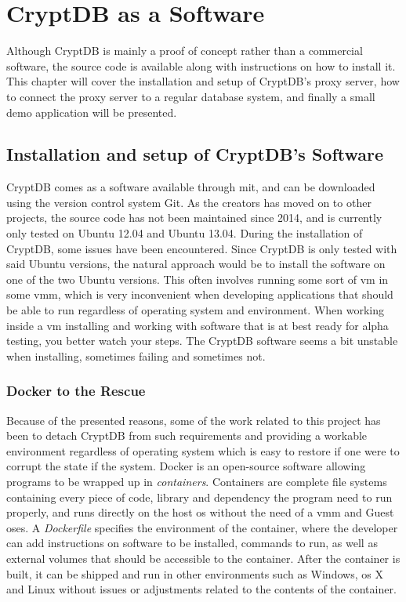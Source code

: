 \chapter{CryptDB as a Software}
\label{chp:software}

Although CryptDB is mainly a proof of concept rather than a commercial software, the source code is available along with instructions on how to install it. This chapter will cover the installation and setup of CryptDB's proxy server, how to connect the proxy server to a regular database system, and finally a small demo application will be presented.

\section{Installation and setup of CryptDB's Software}

CryptDB comes as a software available through \gls{mit}, and can be downloaded using the version control system Git. As the creators has moved on to other projects, the source code has not been maintained since 2014, and is currently only tested on Ubuntu 12.04 and Ubuntu 13.04. During the installation of CryptDB, some issues have been encountered. Since CryptDB is only tested with said Ubuntu versions, the natural approach would be to install the software on one of the two Ubuntu versions. This often involves running some sort of \gls{vm} in some \gls{vmm}, which is very inconvenient when developing applications that should be able to run regardless of operating system and environment. When working inside a \gls{vm} installing and working with software that is at best ready for alpha testing, you better watch your steps. The CryptDB software seems a bit unstable when installing, sometimes failing and sometimes not. 


\subsection{Docker to the Rescue}


Because of the presented reasons, some of the work related to this project has been to detach CryptDB from such requirements and providing a workable environment regardless of operating system which is easy to restore if one were to corrupt the state if the system. Docker \cite{docker_homepage} is an open-source software allowing programs to be wrapped up in \emph{containers}. Containers are complete file systems containing every piece of code, 
library and dependency the program need to run properly, and runs directly on the host \gls{os} without the need of a \gls{vmm} and Guest \gls{os}es. A \emph{Dockerfile} specifies the environment of the container, where the developer can add instructions on software to be installed, commands to run, as well as external volumes that should be accessible to the container. After the container is built, it can be shipped and run in other environments such as Windows, \gls{os} X and Linux without issues or adjustments related to the contents of the container.


